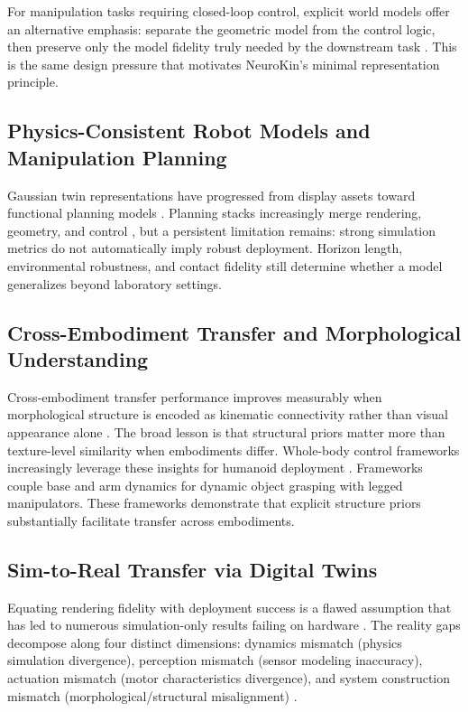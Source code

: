 \documentclass[12pt,a4paper,oneside]{report}
\begin{document}
For manipulation tasks requiring closed-loop control, explicit world models offer an alternative emphasis: separate the geometric model from the control logic, then preserve only the model fidelity truly needed by the downstream task \cite{li2024explicit, yu2025artgs, wu2025reartgs}. This is the same design pressure that motivates NeuroKin's minimal representation principle.

\subsection{Physics-Consistent Robot Models and Manipulation Planning}
Gaussian twin representations have progressed from display assets toward functional planning models \cite{lou2024robogs, guo2025articulatedgs, dai2025freeartgs, chen2025freegaussian}. Planning stacks increasingly merge rendering, geometry, and control \cite{sun2026digitaltwin, lu2024manigaussian, pan2025selfcorrecting, jiang2025gsworld, escontrela2025gaussgym}, but a persistent limitation remains: strong simulation metrics do not automatically imply robust deployment. Horizon length, environmental robustness, and contact fidelity still determine whether a model generalizes beyond laboratory settings.

\subsection{Cross-Embodiment Transfer and Morphological Understanding}
Cross-embodiment transfer performance improves measurably when morphological structure is encoded as kinematic connectivity rather than visual appearance alone \cite{wu2025dexgrasp, patel2024getzero}. The broad lesson is that structural priors matter more than texture-level similarity when embodiments differ. Whole-body control frameworks increasingly leverage these insights for humanoid deployment \cite{zhao2026agile, liang2025wholebody, ren2026cybowaiter, peng2026eagle, li2026haic}. Frameworks couple base and arm dynamics for dynamic object grasping with legged manipulators. These frameworks demonstrate that explicit structure priors substantially facilitate transfer across embodiments.

\subsection{Sim-to-Real Transfer via Digital Twins}
Equating rendering fidelity with deployment success is a flawed assumption that has led to numerous simulation-only results failing on hardware \cite{aljalbout2026realitygap}. The reality gaps decompose along four distinct dimensions: dynamics mismatch (physics simulation divergence), perception mismatch (sensor modeling inaccuracy), actuation mismatch (motor characteristics divergence), and system construction mismatch (morphological/structural misalignment) \cite{aljalbout2026realitygap, tan2018simtoreal}.
\end{document}
